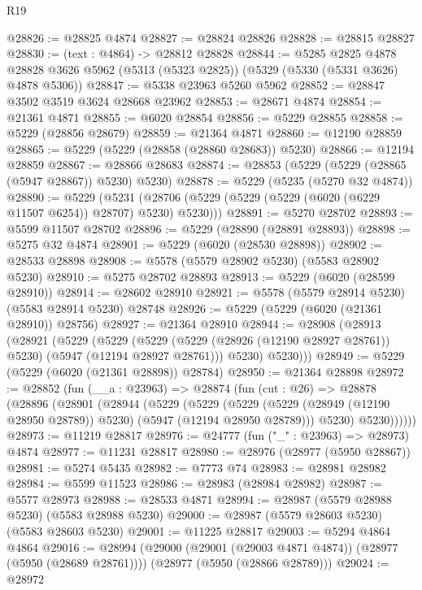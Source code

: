 \begin{lexlean}{R19}
\begin{coremodule}
@28826 := @28825 @4874
@28827 := @28824 @28826
@28828 := @28815 @28827
@28830 := (text : @4864) -> @28812 @28828
@28844 := @5285
    @2825
    @4878
    @28828
    @3626
    @5962
    (@5313 (@5323 @2825))
    (@5329 (@5330 (@5331 @3626) @4878 @5306))
@28847 := @5338 @23963 @5260 @5962
@28852 := @28847 @3502 @3519 @3624 @28668 @23962
@28853 := @28671 @4874
@28854 := @21361 @4871
@28855 := @6020 @28854
@28856 := @5229 @28855
@28858 := @5229 (@28856 @28679)
@28859 := @21364 @4871
@28860 := @12190 @28859
@28865 := @5229 (@5229 (@28858 (@28860 @28683)) @5230)
@28866 := @12194 @28859
@28867 := @28866 @28683
@28874 := @28853 (@5229 (@5229 (@28865 (@5947 @28867)) @5230) @5230)
@28878 := @5229 (@5235 (@5270 @32 @4874))
@28890 := @5229
    (@5231 (@28706 (@5229 (@5229 (@5229 (@6020 (@6229 @11507 @6254)) @28707) @5230) @5230)))
@28891 := @5270 @28702
@28893 := @5599 @11507 @28702
@28896 := @5229 (@28890 (@28891 @28893))
@28898 := @5275 @32 @4874
@28901 := @5229 (@6020 (@28530 @28898))
@28902 := @28533 @28898
@28908 := @5578 (@5579 @28902 @5230) (@5583 @28902 @5230)
@28910 := @5275 @28702 @28893
@28913 := @5229 (@6020 (@28599 @28910))
@28914 := @28602 @28910
@28921 := @5578 (@5579 @28914 @5230) (@5583 @28914 @5230) @28748
@28926 := @5229 (@5229 (@6020 (@21361 @28910)) @28756)
@28927 := @21364 @28910
@28944 := @28908
    (@28913
      (@28921
        (@5229
          (@5229
            (@5229 (@5229 (@28926 (@12190 @28927 @28761)) @5230) (@5947 (@12194 @28927 @28761)))
            @5230)
          @5230)))
@28949 := @5229 (@5229 (@6020 (@21361 @28898)) @28784)
@28950 := @21364 @28898
@28972 := @28852
    (fun (__a : @23963) =>
    @28874
      (fun (cut : @26) =>
      @28878
        (@28896
          (@28901
            (@28944
              (@5229
                (@5229
                  (@5229
                    (@5229 (@28949 (@12190 @28950 @28789)) @5230)
                    (@5947 (@12194 @28950 @28789)))
                  @5230)
                @5230))))))
@28973 := @11219 @28817
@28976 := @24777 (fun ("_" : @23963) => @28973) @4874
@28977 := @11231 @28817
@28980 := @28976 (@28977 (@5950 @28867))
@28981 := @5274 @5435
@28982 := @7773 @74
@28983 := @28981 @28982
@28984 := @5599 @11523
@28986 := @28983 (@28984 @28982)
@28987 := @5577 @28973
@28988 := @28533 @4871
@28994 := @28987 (@5579 @28988 @5230) (@5583 @28988 @5230)
@29000 := @28987 (@5579 @28603 @5230) (@5583 @28603 @5230)
@29001 := @11225 @28817
@29003 := @5294 @4864 @4864
@29016 := @28994
    (@29000 (@29001 (@29003 @4871 @4874)) (@28977 (@5950 (@28689 @28761))))
    (@28977 (@5950 (@28866 @28789)))
@29024 := @28972

\end{coremodule}
\end{lexlean}
